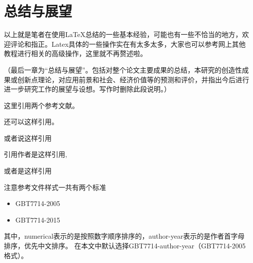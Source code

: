 \section{总结与展望}

以上就是笔者在使用\LaTeX{}总结的一些基本经验，可能也有一些不恰当的地方，欢迎评论和指正。Latex具体的一些操作实在有太多太多，大家也可以参考网上其他教程进行相关的高级操作，这里就不再赘述啦。

（最后一章为“总结与展望”。包括对整个论文主要成果的总结，本研究的创造性成果或创新点理论，对应用前景和社会、经济价值等的预测和评价，并指出今后进行进一步研究工作的展望与设想。写作时删除此段说明。）

这里引用两个参考文献\cite{2001Applying}\cite{2004PSO_ZhangLibiao}。

还可以这样引用\cite{2001Applying,2021A}。

或者说这样引用\cite{2001Applying,2004PSO_ZhangLibiao,2021A}

引用作者是这样引用\citet{2001Applying},\citet{2004PSO_ZhangLibiao}

或者是这样引用\citep{2001Applying}

注意参考文件样式一共有两个标准

\begin{itemize}
    \item GBT7714-2005
    \item GBT7714-2015
\end{itemize}

其中，numerical表示的是按照数字顺序排序的，author-year表示的是作者首字母排序，优先中文排序。
在本文中默认选择GBT7714-author-year（GBT7714-2005格式）。
